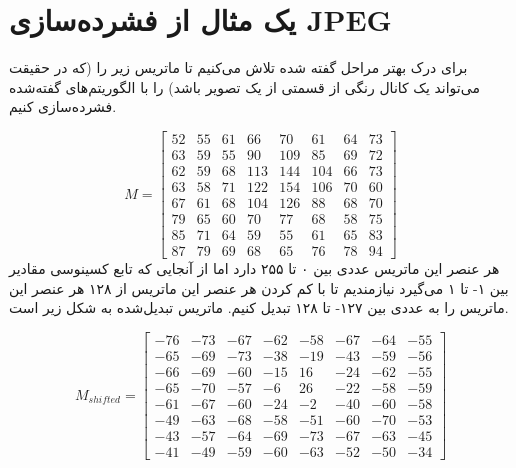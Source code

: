 \section{یک مثال از فشرده‌سازی JPEG}
برای درک بهتر مراحل گفته شده تلاش می‌کنیم تا ماتریس زیر را (که در حقیقت می‌تواند 
یک کانال رنگی از قسمتی از یک تصویر باشد) را با الگوریتم‌های گفته‌شده فشرده‌سازی کنیم.

\[
        M = \begin{bmatrix}
                52 & 55 & 61 & 66 & 70 & 61 & 64 & 73\\
                63 & 59 & 55 & 90 & 109 & 85 & 69 & 72 \\
                62 & 59 & 68 & 113 & 144 & 104 & 66 & 73 \\
                63 & 58 & 71 & 122 & 154 & 106 & 70 & 60 \\
                67 & 61 & 68 & 104 & 126 & 88 & 68 & 70 \\
                79 & 65 & 60 & 70 & 77 & 68 & 58 & 75 \\
                85 & 71 & 64 & 59 & 55 & 61 & 65 & 83 \\
                87 & 79 & 69 & 68 & 65 & 76 & 78 & 94 

        \end{bmatrix}
\]
هر عنصر این ماتریس عددی بین ۰ تا ۲۵۵ دارد اما از آنجایی که تابع کسینوسی 
مقادیر بین ۱- تا ۱ می‌گیرد نیازمندیم تا با کم کردن هر عنصر این ماتریس از 
۱۲۸ 
هر عنصر این ماتریس را به عددی بین ۱۲۷- تا ۱۲۸ تبدیل کنیم.
ماتریس تبدیل‌شده به شکل زیر است.

\[
        M_{shifted} = \begin{bmatrix}
                -76 & -73 & -67 & -62 & -58 & -67 & -64 & -55\\
                -65 & -69 & -73 & -38 & -19 & -43 & -59 & -56 \\
                -66 & -69 & -60 & -15 & 16 & -24 & -62 & -55 \\
                -65 & -70 & -57 & -6 & 26 & -22 & -58 & -59 \\
                -61 & -67 & -60 & -24 & -2 & -40 & -60 & -58 \\
                -49 & -63 & -68 & -58 & -51 & -60 & -70 & -53 \\
                -43 & -57 & -64 & -69 & -73 & -67 & -63 & -45 \\
                -41 & -49 & -59 & -60 & -63 & -52 & -50 & -34 

        \end{bmatrix}
\]

